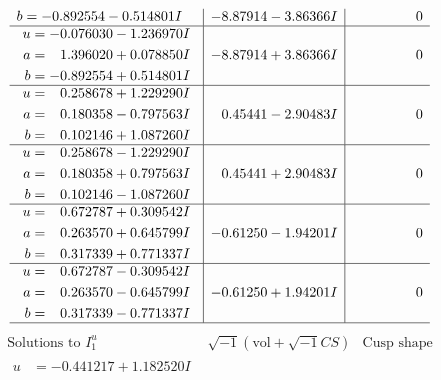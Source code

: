 \documentclass[1p]{elsarticle_modified}
\theoremstyle{definition}
\newcommand{\I}{\sqrt{-1}}
\begin{document}
$$\begin{array}{c|c|c}
\begin{aligned}
b &= -0.892554 - 0.514801 I\end{aligned}
 & -8.87914 - 3.86366 I & \phantom{-0.000000 } 0 \\ \hline\begin{aligned}
u &= -0.076030 - 1.236970 I \\
a &= \phantom{-}1.396020 + 0.078850 I \\
b &= -0.892554 + 0.514801 I\end{aligned}
 & -8.87914 + 3.86366 I & \phantom{-0.000000 } 0 \\ \hline\begin{aligned}
u &= \phantom{-}0.258678 + 1.229290 I \\
a &= \phantom{-}0.180358 - 0.797563 I \\
b &= \phantom{-}0.102146 + 1.087260 I\end{aligned}
 & \phantom{-}0.45441 - 2.90483 I & \phantom{-0.000000 } 0 \\ \hline\begin{aligned}
u &= \phantom{-}0.258678 - 1.229290 I \\
a &= \phantom{-}0.180358 + 0.797563 I \\
b &= \phantom{-}0.102146 - 1.087260 I\end{aligned}
 & \phantom{-}0.45441 + 2.90483 I & \phantom{-0.000000 } 0 \\ \hline\begin{aligned}
u &= \phantom{-}0.672787 + 0.309542 I \\
a &= \phantom{-}0.263570 + 0.645799 I \\
b &= \phantom{-}0.317339 + 0.771337 I\end{aligned}
 & -0.61250 - 1.94201 I & \phantom{-0.000000 } 0 \\ \hline\begin{aligned}
u &= \phantom{-}0.672787 - 0.309542 I \\
a &= \phantom{-}0.263570 - 0.645799 I \\
b &= \phantom{-}0.317339 - 0.771337 I\end{aligned}
 & -0.61250 + 1.94201 I & \phantom{-0.000000 } 0\\
 \hline 
 \end{array}$$\newpage$$\begin{array}{c|c|c}  
\text{Solutions to }I^u_{1}& \I (\text{vol} + \sqrt{-1}CS) & \text{Cusp shape}\\
 \hline 
\begin{aligned}
u &= -0.441217 + 1.182520 I \\

\end{aligned}
\end{array}$$
\end{document}
